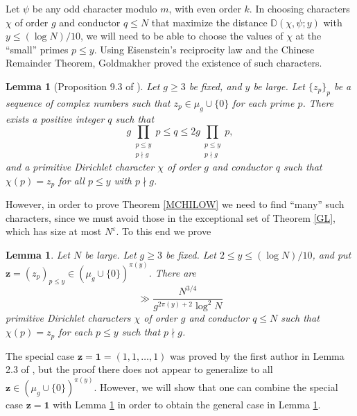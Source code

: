 \documentclass[12pt]{amsart}
\newtheorem{lem}[thm]{Lemma}
\theoremstyle{definition}
\numberwithin{equation}{section}
\newcommand{\mb}{\mathbb}
\newcommand{\mbf}{\mathbf}
\begin{document}

Let $\psi$ be any odd character modulo $m$, with even order $k$. In choosing characters $\chi$ of order $g$ and conductor $q\leq N$ that maximize the distance $\mb{D}(\chi,\psi;y)$  with $y\leq (\log N)/10$, we will need to be able to choose the values of $\chi$ at the ``small'' primes $p \leq y$. Using Eisenstein's reciprocity law and the Chinese Remainder Theorem, Goldmakher \cite{GOLD} proved the existence of such characters.

\begin{lem}[Proposition 9.3 of \cite{GOLD}] \label{FIX}
Let $g \geq 3$ be fixed, and $y$ be large. Let $\{z_p\}_p$ be a sequence of complex numbers such that $z_p\in \mu_g \cup \{0\}$ for each prime $p$. There exists a positive integer $q$ such that $$g\prod_{\substack{p\leq y\\ p\nmid g}} p\leq q\leq  2g\prod_{\substack{p\leq y\\ p\nmid g}}p,$$ and a primitive Dirichlet character $\chi$ of order $g$ and conductor $q$ such that $\chi(p) = z_p$ for all $p \leq y$ with $p\nmid g$.
\end{lem}
However, in order to prove Theorem \ref{MCHILOW} we need to find ``many'' such characters, since we must avoid those in the exceptional set of Theorem \ref{GL}, which has size at most $N^{\varepsilon}$.  To this end we prove
\begin{lem} \label{VEC}
Let $N$ be large. Let $g \geq 3$ be fixed. Let $2 \leq y \leq (\log N)/10$, and put $\mbf{z} = (z_p)_{p \leq y} \in (\mu_g \cup \{0\})^{\pi(y)}$. There are  
$$\gg \frac{N^{3/4}}{g^{2\pi(y)+2} \log^2 N}$$ primitive Dirichlet characters $\chi$ of order $g$ and conductor $q\leq N$ such that $\chi(p) = z_p$ for each $p \leq y$ such that $p\nmid g$.
\end{lem}
The special case $\mbf{z}=\mbf{1}=(1, 1, \dots, 1)$ was proved by the first author in Lemma 2.3 of \cite{LAM}, but the proof there does not appear to generalize to all $\mbf{z}\in (\mu_g \cup \{0\})^{\pi(y)}$. However, we will show that one can combine the special case $\mbf{z}=\mbf{1}$ with Lemma \ref{FIX} in order to obtain the general case in Lemma \ref{VEC}.    
\end{document}
